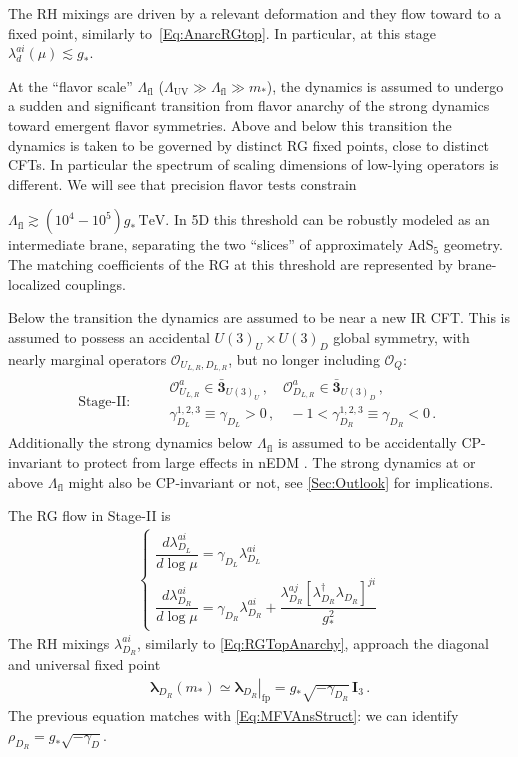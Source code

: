 \documentclass[aps,prl,twocolumn,showpacs,10pt,preprintnumbers,nofootinbib]{revtex4-2}
\newcommand{\TeV}{\,\mathrm{TeV}}
\newcommand{\gst}{g_*}
\newcommand{\mst}{m_*}
\newcommand{\Lfl}{\Lambda_{\text{fl}}}
\newcommand{\LUV}{\Lambda_{\text{UV}}}
\newcommand{\fp}[1]{{\left.#1\right|_{\text{fp}}}}
\newcommand{\op}{\mathcal{O}}
\begin{document}
The RH mixings are driven by a relevant deformation and they flow toward to a fixed point, similarly to~\eqref{Eq:AnarcRGtop}. In particular, at this stage $\lambda_{d}^{ai}(\mu) \lesssim \gst$. 

At the ``flavor scale'' $\Lfl$ ($\LUV \gg \Lfl \gg \mst$), the dynamics is assumed to undergo a sudden and significant transition from flavor anarchy of the strong dynamics toward emergent flavor symmetries. Above and below this transition the dynamics is taken to be governed by distinct RG fixed points, close to distinct CFTs. In particular the spectrum of scaling dimensions of low-lying operators is different. We will see that precision flavor tests constrain {$\Lfl\gtrsim (10^4-10^5)\gst\TeV $. In 5D this threshold can be robustly modeled as an intermediate brane, separating the two ``slices'' of approximately AdS$_5$ geometry. The matching coefficients of the RG at this threshold are represented by brane-localized couplings. 

Below the transition the dynamics are assumed to be near a new IR CFT. This is assumed to possess an accidental $U(3)_U\times U(3)_D$ global symmetry, with nearly marginal operators $\op_{U_{L,R},D_{L,R}}$, but no longer including $\op_Q$:
\begin{align}
    \text{Stage-II}:&& \begin{aligned} &\op^a_{U_{L,R}} \in \bar{\mathbf{3}}_{U(3)_U}\,, \quad \op^a_{D_{L,R}} \in \bar{\mathbf{3}}_{U(3)_D}\,, \\
     &\gamma_{D_L}^{1,2,3} \equiv \gamma_{D_L}>0\,, \quad
        -1 < \gamma_{D_R}^{1,2,3} \equiv \gamma_{D_R} < 0\,.
        \end{aligned}
\end{align}
Additionally the strong dynamics below $\Lfl$ is assumed to be accidentally $\text{CP}$-invariant to protect from large effects in nEDM \cite{Glioti:2024hye}. The strong dynamics at or above $\Lfl$ might also be CP-invariant or not, see \ref{Sec:Outlook} for implications.

The RG flow in Stage-II is 
\begin{align}\label{Eq:RGEvolutionPhaseII}
\begin{cases}
    \dfrac{d \lambda_{D_L}^{ai}}{d \log \mu} = \gamma_{D_L} \lambda_{D_L}^{ai}  \\[10pt]
    \dfrac{d \lambda_{D_R}^{ai}}{d \log \mu} = \gamma_{D_R} \lambda_{D_R}^{ai} + \dfrac{\lambda_{D_R}^{aj} [ \lambda_{D_R}^{\dagger}\lambda_{D_R}]^{ji}}{g_*^2}
\end{cases}
\end{align}
The RH mixings $\lambda_{D_R}^{ai}$, similarly to \eqref{Eq:RGTopAnarchy}, approach the diagonal and universal fixed point
\begin{align}\label{Eq:DiagonalRH}
    \boldsymbol{\lambda}_{D_R}(\mst) \simeq \fp{\boldsymbol{\lambda}_{D_R}}=\gst \sqrt{-\gamma_{D_R}}\,\mathbf{I}_3\,.
\end{align} 
The previous equation matches with \eqref{Eq:MFVAnsStruct}: we can identify $\rho_{D_R} = \gst \sqrt{-\gamma_D}$.

}
\end{document}
